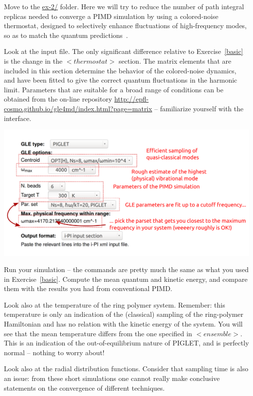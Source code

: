 \documentclass{article}
\begin{document}
\begin{Exercise}[label={piglet},title={Colored-noise thermostatting}]

Move to the \url{ex-2/} folder. Here we will try to reduce the number of 
path integral replicas needed to converge a PIMD simulation by using 
a colored-noise thermostat, designed to selectively enhance fluctuations 
of high-frequency modes, so as to match the quantum predictions~\cite{ceri-mano12prl}.

\Question 
Look at the input file. The only significant difference relative to
Exercise~\ref{basic} is the change in the \lstinxml$<thermostat>$ section. 
The matrix elements that are included in this section determine the behavior
of the colored-noise dynamics, and have been fitted to give the correct
quantum fluctuations in the harmonic limit. Parameters that are suitable for
a broad range of conditions can be obtained from the on-line repository
\url{http://epfl-cosmo.github.io/gle4md/index.html?page=matrix} -- familiarize
yourself with the interface.

\ExeText
\includegraphics[width=1.0\textwidth]{gle4md.pdf}

\Question
Run your simulation -- the commands are pretty much the same as what you 
used in Exercise~\ref{basic}.  Compute the mean quantum and kinetic energy,
and compare them with the results you had from conventional PIMD. 

\Question 
Look also at the temperature of the ring polymer system. Remember: this temperature
is only an indication of the (classical) sampling of the ring-polymer Hamiltonian
and has no relation with the kinetic energy of the system. You will see that the mean
temperature differs from the one specified in \lstinxml$<ensemble>$. This is 
an indication of the out-of-equilibrium nature of PIGLET, and is perfectly normal --
nothing to worry about!

\Question Look also at the radial distribution functions. Consider that sampling 
time is also an issue: from these short simulations one cannot really 
make conclusive statements on the convergence of different techniques.

\end{Exercise}
\end{document}
